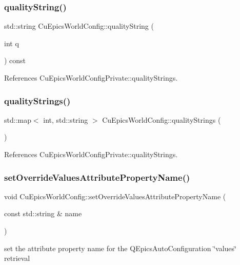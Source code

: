 \subsubsection{quality\+String()}
{\footnotesize\ttfamily std\+::string Cu\+Epics\+World\+Config\+::quality\+String (\begin{DoxyParamCaption}\item[{int}]{q }\end{DoxyParamCaption}) const}



References Cu\+Epics\+World\+Config\+Private\+::quality\+Strings.

\mbox{\label{classCuEpicsWorldConfig_a1661e7600ea2a3382a7b8a419c084906}} 
\subsubsection{quality\+Strings()}
{\footnotesize\ttfamily std\+::map$<$ int, std\+::string $>$ Cu\+Epics\+World\+Config\+::quality\+Strings (\begin{DoxyParamCaption}{ }\end{DoxyParamCaption})}



References Cu\+Epics\+World\+Config\+Private\+::quality\+Strings.

\mbox{\label{classCuEpicsWorldConfig_aa50bf286bebfd5367d5eabe3e1d3e3fe}} 
\subsubsection{set\+Override\+Values\+Attribute\+Property\+Name()}
{\footnotesize\ttfamily void Cu\+Epics\+World\+Config\+::set\+Override\+Values\+Attribute\+Property\+Name (\begin{DoxyParamCaption}\item[{const std\+::string \&}]{name }\end{DoxyParamCaption})}



set the attribute property name for the Q\+Epics\+Auto\+Configuration \char`\"{}values\char`\"{} retrieval 

